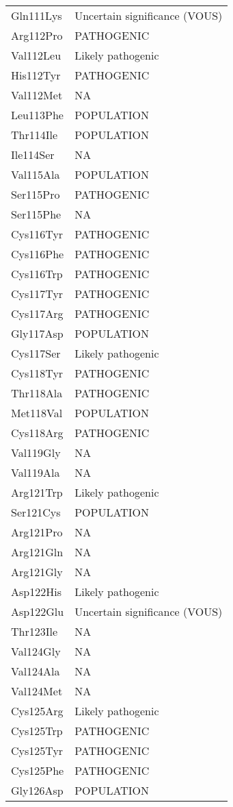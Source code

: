 \begin{tiny}
\begin{longtable}[l]{l|l}
	Gln111Lys & Uncertain significance (VOUS) \\
	Arg112Pro & PATHOGENIC \\
	Val112Leu & Likely pathogenic \\
	His112Tyr & PATHOGENIC \\
	Val112Met & NA \\
	Leu113Phe & POPULATION \\
	Thr114Ile & POPULATION \\
	Ile114Ser & NA \\
	Val115Ala & POPULATION \\
	Ser115Pro & PATHOGENIC \\
	Ser115Phe & NA \\
	Cys116Tyr & PATHOGENIC \\
	Cys116Phe & PATHOGENIC \\
	Cys116Trp & PATHOGENIC \\
	Cys117Tyr & PATHOGENIC \\
	Cys117Arg & PATHOGENIC \\
	Gly117Asp & POPULATION \\
	Cys117Ser & Likely pathogenic \\
	Cys118Tyr & PATHOGENIC \\
	Thr118Ala & PATHOGENIC \\
	Met118Val & POPULATION \\
	Cys118Arg & PATHOGENIC \\
	Val119Gly & NA \\
	Val119Ala & NA \\
	Arg121Trp & Likely pathogenic \\
	Ser121Cys & POPULATION \\
	Arg121Pro & NA \\
	Arg121Gln & NA \\
	Arg121Gly & NA \\
	Asp122His & Likely pathogenic \\
	Asp122Glu & Uncertain significance (VOUS) \\
	Thr123Ile & NA \\
	Val124Gly & NA \\
	Val124Ala & NA \\
	Val124Met & NA \\
	Cys125Arg & Likely pathogenic \\
	Cys125Trp & PATHOGENIC \\
	Cys125Tyr & PATHOGENIC \\
	Cys125Phe & PATHOGENIC \\
	Gly126Asp & POPULATION \\

\end{longtable}
\end{tiny}
